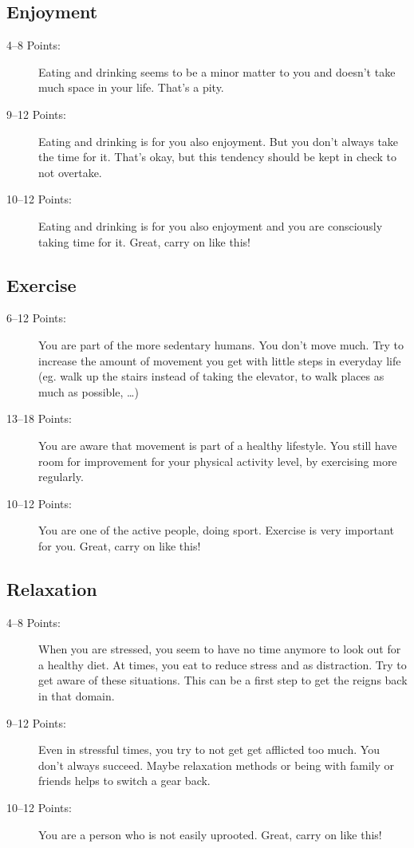 \documentclass[../main.tex]{subfiles}
\begin{document}
\subsection{Enjoyment}

\begin{description}
\item[4--8 Points:]  Eating and drinking seems to be a minor matter to you and doesn't take much space in your life.
That's a pity.
\item[9--12 Points:] Eating and drinking is for you also enjoyment. But you don't always take the time for it.
That's okay, but this tendency should be kept in check to not overtake.
\item[10--12 Points:] Eating and drinking is for you also enjoyment and you are consciously taking time for it.
  Great, carry on like this!
\end{description}


\subsection{Exercise}

\begin{description}
\item[6--12 Points:]  You are part of the more sedentary humans.
  You don't move much.
  Try to increase the amount of movement you get with little steps in everyday life
  (eg. walk up the stairs instead of taking the elevator, to walk places as much as possible, \ldots)
\item[13--18 Points:] You are aware that movement is part of a healthy lifestyle.
  You still have room for improvement for your physical activity level, by exercising more regularly.
\item[10--12 Points:] You are one of the active people, doing sport.
  Exercise is very important for you.
  Great, carry on like this!
\end{description}


\subsection{Relaxation}

\begin{description}
\item[4--8 Points:]  When you are stressed, you seem to have no time anymore to look out for a healthy diet.
  At times, you eat to reduce stress and as distraction.
  Try to get aware of these situations.
  This can be a first step to get the reigns back in that domain.
\item[9--12 Points:] Even in stressful times, you try to not get get afflicted too much.
  You don't always succeed.
  Maybe relaxation methods or being with family or friends helps to switch a gear back.
\item[10--12 Points:] You are a person who is not easily uprooted.
  Great, carry on like this!
\end{description}
\end{document}

